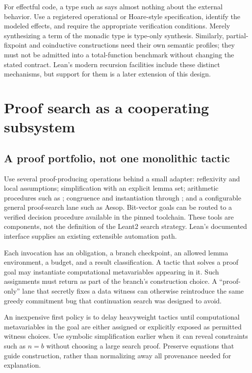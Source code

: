 For effectful code, a type such as  says almost nothing about the external behavior. Use a registered operational or Hoare-style specification, identify the modeled effects, and require the appropriate verification conditions. Merely synthesizing a term of the monadic type is type-only synthesis. Similarly, partial-fixpoint and coinductive constructions need their own semantic profiles; they must not be admitted into a total-function benchmark without changing the stated contract. Lean's modern recursion facilities include these distinct mechanisms, but support for them is a later extension of this design.\cite{recursion}

\section{Proof search as a cooperating subsystem}
\label{sec:proofs}
\subsection{A proof portfolio, not one monolithic tactic}
Use several proof-producing operations behind a small adapter: reflexivity and local assumptions; simplification with an explicit lemma set; arithmetic procedures such as ; congruence and instantiation through ; and a configurable general proof-search lane such as Aesop. Bit-vector goals can be routed to a verified decision procedure available in the pinned toolchain. These tools are components, not the definition of the Leant2 search strategy. Lean's documented  interface supplies an existing extensible automation path.\cite{grind,aesop}

Each invocation has an obligation, a branch checkpoint, an allowed lemma environment, a budget, and a result classification. A tactic that solves a proof goal may instantiate computational metavariables appearing in it. Such assignments must return as part of the branch's construction choice. A ``proof-only'' lane that secretly fixes a data witness can otherwise reintroduce the same greedy commitment bug that continuation search was designed to avoid.

An inexpensive first policy is to delay heavyweight tactics until computational metavariables in the goal are either assigned or explicitly exposed as permitted witness choices. Use symbolic simplification earlier when it can reveal constraints such as $n=b$ without choosing a large search proof. Preserve equations that guide construction, rather than normalizing away all provenance needed for explanation.

